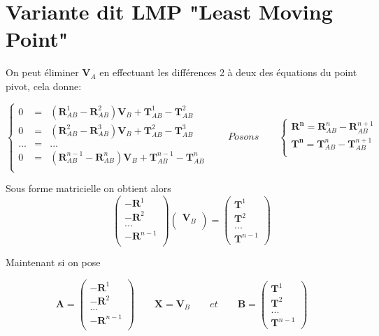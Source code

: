 \documentclass[12pt,a4paper]{article}
\begin{document}
	\newpage
	\section{Variante dit LMP "Least Moving Point"}
	
	On peut éliminer $\mathbf{V}_A$ en effectuant les différences 2 à deux des équations du point pivot, cela donne:
	
	\[
	\left\{
	\begin{array}{ccc}
	0&=& (\mathbf{R}^1_{AB}-\mathbf{R}^2_{AB}) \mathbf{V}_B +\mathbf{T}^1_{AB}-\mathbf{T}^2_{AB}\\
	0&=& (\mathbf{R}^2_{AB}-\mathbf{R}^3_{AB}) \mathbf{V}_B +\mathbf{T}^2_{AB}-\mathbf{T}^3_{AB}\\
	...&=&...\\
	0&=& (\mathbf{R}^{n-1}_{AB}-\mathbf{R}^n_{AB}) \mathbf{V}_B +\mathbf{T}^{n-1}_{AB}-\mathbf{T}^n_{AB}\\
	\end{array}
	\right.
	\qquad
	Posons
	\qquad
	\left\{
	\begin{array}{l} 
	\mathbf{R^n}=\mathbf{R}^{n}_{AB}-\mathbf{R}^{n+1}_{AB}\\
	\mathbf{T^n}=\mathbf{T}^{n}_{AB}-\mathbf{T}^{n+1}_{AB}\\
	\end{array}
	\right.
	\]
	
	Sous forme matricielle on obtient alors
	\[
	\qquad
	\left(
	\begin{array}{c}
	-\mathbf{R}^1\\
	-\mathbf{R}^2\\
	...\\
	-\mathbf{R}^{n-1}\\
	\end{array}
	\right)		
	\left(
	\begin{array}{c}
	\mathbf{V}_B \\
	\end{array}
	\right)
	=
	\left(
	\begin{array}{c}
	\mathbf{T}^1 \\
	\hline
	\mathbf{T}^2 \\
	\hline
	...\\
	\hline
	\mathbf{T}^{n-1}
	\end{array}
	\right)
	\]
	
	Maintenant si on pose 
	
	\[
	\mathbf{A}=\left(
	\begin{array}{c}
	-\mathbf{R}^1\\
	-\mathbf{R}^2\\
	...\\
	-\mathbf{R}^{n-1}\\
	\end{array}
	\right)		
	\qquad 
	\mathbf{X}=\mathbf{V}_B
	\qquad
	et
	\qquad
	\mathbf{B}=\left(
	\begin{array}{c}
	\mathbf{T}^1 \\
	\hline
	\mathbf{T}^2 \\
	\hline
	...\\
	\hline
	\mathbf{T}^{n-1}
	\end{array}
	\right)	
	\]
	
\end{document}
